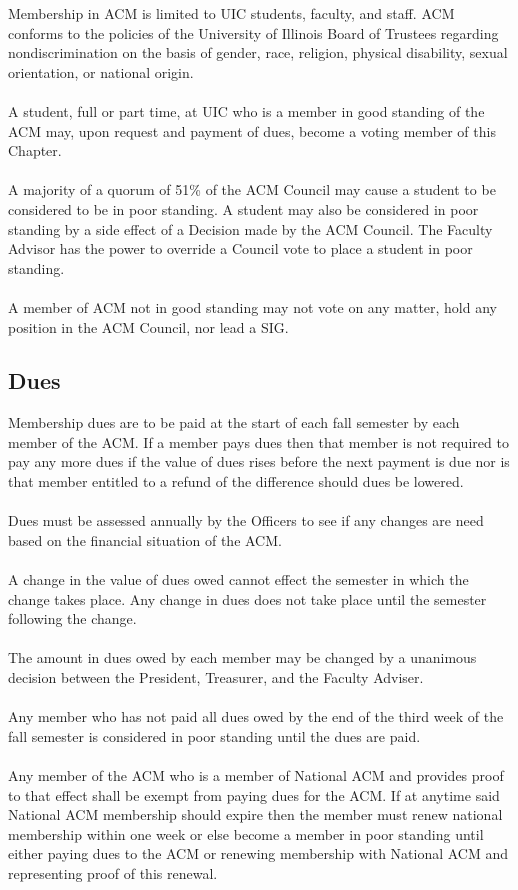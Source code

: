 \documentclass[12pt,titlepage]{article}
\begin{document}
Membership in ACM is limited to UIC students, faculty, and staff. ACM conforms to the policies of the University of Illinois Board of Trustees regarding nondiscrimination on the basis of gender, race, religion, physical disability, sexual orientation, or national origin.\\
\\
A student, full or part time, at UIC who is a member in good standing of the ACM may, upon request and payment of dues, become a voting member of this Chapter.\\
\\
A majority of a quorum of 51\% of the ACM Council may cause a student to be considered to be in poor standing. A student may also be considered in poor standing by a side effect of a Decision made by the ACM Council. The Faculty Advisor has the power to override a Council vote to place a student in poor standing.\\
\\
A member of ACM not in good standing may not vote on any matter, hold any position in the ACM Council, nor lead a SIG.

\subsection{Dues}

Membership dues are to be paid at the start of each fall semester by each member of the ACM. If a member pays dues then that member is not required to pay any more dues if the value of dues rises before the next payment is due nor is that member entitled to a refund of the difference should dues be lowered.\\
\\
Dues must be assessed annually by the Officers to see if any changes are need based on the financial situation of the ACM.\\
\\
A change in the value of dues owed cannot effect the semester in which the change takes place. Any change in dues does not take place until the semester following the change.\\
\\
The amount in dues owed by each member may be changed by a unanimous decision between the President, Treasurer, and the Faculty Adviser.\\
\\
Any member who has not paid all dues owed by the end of the third week of the fall semester is considered in poor standing until the dues are paid.\\
\\
Any member of the ACM who is a member of National ACM and provides proof to that effect shall be exempt from paying dues for the ACM. If at anytime said National ACM membership should expire then the member must renew national membership within one week or else become a member in poor standing until either paying dues to the ACM or renewing membership with National ACM and representing proof of this renewal.\\
\end{document}
